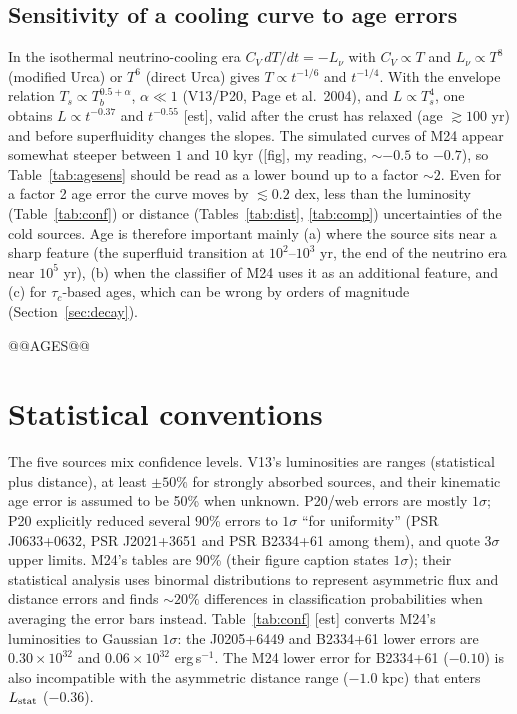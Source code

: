 \documentclass[11pt,a4paper]{article}
\newcommand{\src}[1]{\textsf{[#1]}}
\begin{document}
\subsection{Sensitivity of a cooling curve to age errors}\label{sec:ageerr}
In the isothermal neutrino-cooling era $C_V\,dT/dt=-L_\nu$ with $C_V\propto T$ and $L_\nu\propto T^8$ (modified Urca) or $T^6$ (direct Urca) gives $T\propto t^{-1/6}$ and $t^{-1/4}$. With the envelope relation $T_s\propto T_b^{0.5+\alpha}$, $\alpha\ll1$ (V13/P20, Page et al.\ 2004), and $L\propto T_s^4$, one obtains $L\propto t^{-0.37}$ and $t^{-0.55}$ \src{est}, valid after the crust has relaxed (age $\gtrsim100$ yr) and before superfluidity changes the slopes. The simulated curves of M24 appear somewhat steeper between $1$ and $10$ kyr (\src{fig}, my reading, $\sim-0.5$ to $-0.7$), so Table~\ref{tab:agesens} should be read as a lower bound up to a factor $\sim2$. Even for a factor 2 age error the curve moves by $\lesssim0.2$ dex, less than the luminosity (Table~\ref{tab:conf}) or distance (Tables~\ref{tab:dist}, \ref{tab:comp}) uncertainties of the cold sources. Age is therefore important mainly (a) where the source sits near a sharp feature (the superfluid transition at $10^2$--$10^3$ yr, the end of the neutrino era near $10^5$ yr), (b) when the classifier of M24 uses it as an additional feature, and (c) for $\tau_c$-based ages, which can be wrong by orders of magnitude (Section~\ref{sec:decay}).

@@AGES@@

\section{Statistical conventions}\label{sec:stats}
The five sources mix confidence levels. V13's luminosities are ranges (statistical plus distance), at least $\pm50\%$ for strongly absorbed sources, and their kinematic age error is assumed to be 50\% when unknown. P20/web errors are mostly $1\sigma$; P20 explicitly reduced several 90\% errors to $1\sigma$ ``for uniformity'' (PSR J0633+0632, PSR J2021+3651 and PSR B2334+61 among them), and quote $3\sigma$ upper limits. M24's tables are 90\% (their figure caption states $1\sigma$); their statistical analysis uses binormal distributions to represent asymmetric flux and distance errors and finds $\sim20\%$ differences in classification probabilities when averaging the error bars instead. Table~\ref{tab:conf} \src{est} converts M24's luminosities to Gaussian $1\sigma$: the J0205+6449 and B2334+61 lower errors are $0.30\times10^{32}$ and $0.06\times10^{32}$ erg\,s$^{-1}$. The M24 lower error for B2334+61 ($-0.10$) is also incompatible with the asymmetric distance range ($-1.0$ kpc) that enters $L_{\rm stat}$ ($-0.36$).
\end{document}
